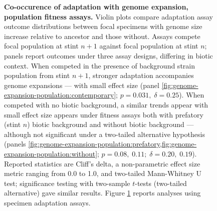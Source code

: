 \begin{figure}
\caption{
    \textbf{Co-occurence of adaptation with genome expansion, population fitness assays.}
    \footnotesize
    Violin plots compare adaptation assay outcome distributions between focal specimens with genome size increase relative to ancestor and those without.
    Assays compete focal population at stint $n+1$ against focal population at stint $n$;
    panels report outcomes under three assay designs, differing in biotic context.
    When competed in the presence of background strain population from stint $n+1$, stronger adaptation accompanies genome expansions --- with small effect size (panel \ref{fig:genome-expansion-population:contemporary}; $p = 0.031, \; \delta = 0.25$).
    When competed with no biotic background, a similar trends appear with small effect size appears under fitness assays both with prefatory (stint $n$) biotic background and without biotic background --- although not significant under a two-tailed alternative hypothesis (panels \cref{fig:genome-expansion-population:prefatory,fig:genome-expansion-population:without}; $p=0.08,\; 0.11; \; \delta = 0.20, \; 0.19$).
    Reported statistics are Cliff's delta, a non-parametric effect size metric ranging from 0.0 to 1.0, and two-tailed Mann-Whitney U test; significance testing with two-sample $t$-tests (two-tailed alternative) gave similar results.
    Figure \ref{fig:genome-expansion-population} reports analyses using specimen adaptation assays.
}
\label{fig:genome-expansion-population}

\end{figure}
